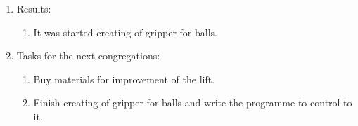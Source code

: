 \begin{enumerate}
\begin{enumerate}
    \end{enumerate}
    
	\item Results: 
	\begin{enumerate}
	  \item It was started creating of gripper for balls.
      
    \end{enumerate}
    
	\item Tasks for the next congregations:
	\begin{enumerate}
	  \item Buy materials for improvement of the lift.
	  
	  \item Finish creating of gripper for balls and write the programme to control to it.

    \end{enumerate}     
\end{enumerate}
\fillpage
